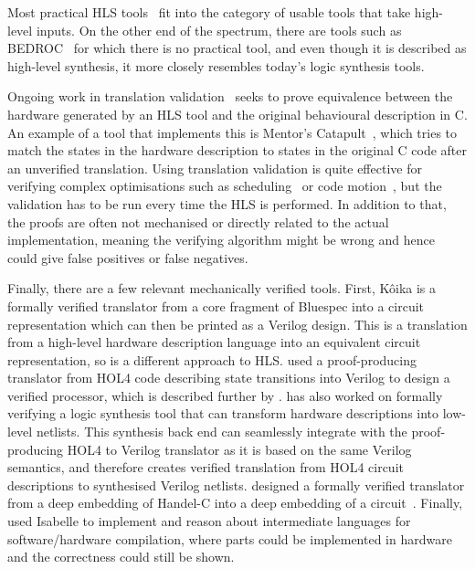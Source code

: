 Most practical \gls{HLS}
tools~\cite{canis13_l,amd23_vitis_high_synth,intel20_sdk_openc_applic,nigam20_predic_accel_desig_time_sensit_affin_types}
fit into the category of usable tools that take high-level inputs.  On the other
end of the spectrum, there are tools such as
BEDROC~\cite{chapman92_verif_bedroc} for which there is no practical tool, and
even though it is described as high-level synthesis, it more closely resembles
today's logic synthesis tools.

Ongoing work in translation validation~\cite{pnueli98_trans} seeks to prove
equivalence between the hardware generated by an HLS tool and the original
behavioural description in C.  An example of a tool that implements this is
Mentor's Catapult~\cite{mentor20_catap_high_level_synth}, which tries to match
the states in the hardware description to states in the original C code after an
unverified translation.  Using translation validation is quite effective for
verifying complex optimisations such as
scheduling~\cite{kim04_autom_fsmd,karfa06_formal_verif_method_sched_high_synth,chouksey20_verif_sched_condit_behav_high_level_synth}
or code
motion~\cite{banerjee14_verif_code_motion_techn_using_value_propag,chouksey19_trans_valid_code_motion_trans_invol_loops},
but the validation has to be run every time the HLS is performed.  In addition
to that, the proofs are often not mechanised or directly related to the actual
implementation, meaning the verifying algorithm might be wrong and hence could
give false positives or false negatives.

Finally, there are a few relevant mechanically verified tools.  First, K\^{o}ika
is a formally verified translator from a core fragment of Bluespec into a
circuit representation which can then be printed as a Verilog design.  This is a
translation from a high-level hardware description language into an equivalent
circuit representation, so is a different approach to HLS.
\textcite{lööw19_proof_trans_veril_devel_hol} used a proof-producing translator
from HOL4 code describing state transitions into Verilog to design a verified
processor, which is described further by
\textcite{lööw19_verif_compil_verif_proces}. \textcite{lööw21_lutsig} has also
worked on formally verifying a logic synthesis tool that can transform hardware
descriptions into low-level netlists.  This synthesis back end can seamlessly
integrate with the proof-producing HOL4 to Verilog translator as it is based on
the same Verilog semantics, and therefore creates verified translation from HOL4
circuit descriptions to synthesised Verilog netlists.
\citeauthor{perna12_mechan_wire_wise_verif_handel_c_synth} designed a formally
verified translator from a deep embedding of Handel-C into a deep embedding of a
circuit~\cite{perna12_mechan_wire_wise_verif_handel_c_synth,perna11_correc_hardw_synth}.
Finally, \textcite{ellis08_csicgfu} used Isabelle to implement and reason about
intermediate languages for software/hardware compilation, where parts could be
implemented in hardware and the correctness could still be shown.

